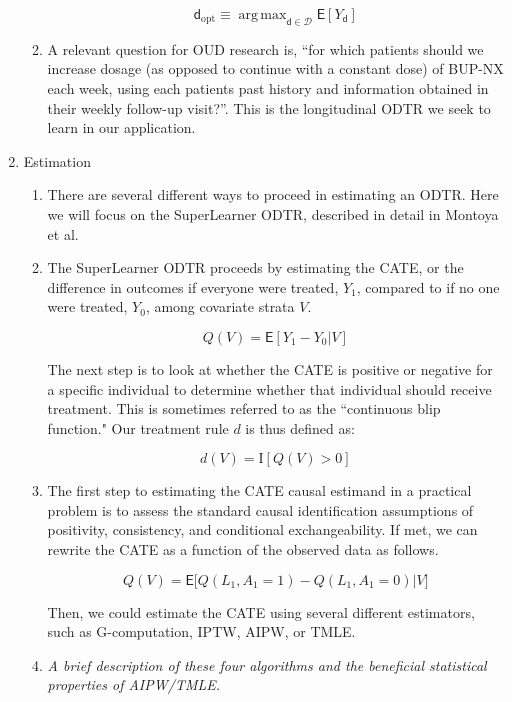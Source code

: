 \documentclass[11pt]{article}
\DeclareMathOperator*{\argmax}{arg\,max}
\renewcommand{\d}{\mathsf{d}}
\newcommand{\E}{\mathsf{E}}
\begin{document}
\begin{enumerate}
\begin{enumerate}
		$$
		\d_{\text{opt}} \equiv \argmax_{\d \in \mathcal{D}} \E [Y_{\d}]
		$$
		
		\item A relevant question for OUD research is, ``for which patients should we increase dosage (as opposed to continue with a constant dose) of BUP-NX each week, using each patients past history and information obtained in their weekly follow-up visit?''. This is the longitudinal ODTR we seek to learn in our application.
		
	\end{enumerate}
	
	
	\item Estimation
	
	\begin{enumerate}
		
		\item There are several different ways to proceed in estimating an ODTR. Here we will focus on the SuperLearner ODTR, described in detail in Montoya et al.
		\item The SuperLearner ODTR proceeds by estimating the CATE, or the difference in outcomes if everyone were treated, $Y_1$, compared to if no one were treated, $Y_0$, among covariate strata $V$.
		
		\begin{equation}
		Q(V) = \E[Y_1 - Y_0 | V]
		\end{equation}
		
		The next step is to look at whether the CATE is positive or negative for a specific individual to determine whether that individual should receive treatment. This is sometimes referred to as the ``continuous blip function."  Our treatment rule $d$ is thus defined as: 
		
		\begin{equation}
		d(V) = \mathrm{I}[Q(V) > 0]
		\end{equation}
		
		\item The first step to estimating the CATE causal estimand in a practical problem is to assess the standard causal identification assumptions of positivity, consistency, and conditional exchangeability. If met, we can rewrite the CATE as a function of the observed data as follows.
		
		\begin{equation}
		Q(V) = \E\Big[Q(L_1, A_1 = 1) - Q(L_1, A_1 = 0) \Big| V\Big]  
		\end{equation}
				
		  Then, we could estimate the CATE using several different estimators, such as G-computation, IPTW, AIPW, or TMLE.
		\item \emph{A brief description of these four algorithms and the beneficial statistical properties of AIPW/TMLE.}
		

\end{enumerate}
\end{enumerate}
\end{document}
